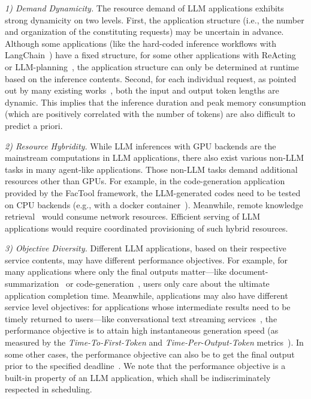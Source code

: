  \emph{1) Demand Dynamicity.}
        The resource demand of LLM applications exhibits strong dynamicity on two levels. %
        First, the application structure (i.e., the number and organization of the constituting requests) may be uncertain in advance.
        Although some applications (like the hard-coded inference workflows with LangChain~\cite{topsakal2023creating}) have a fixed structure, for some other applications with ReActing~\cite{ji2023towards,yao2022react} or LLM-planning~\cite{shen2024hugginggpt}, the application structure can only be determined at runtime based on the inference contents. 
        Second, for each individual request, as pointed out by many existing works~\cite{gao2024cost,wu2023fast}, both the input and output token lengths are dynamic.
        This implies that the inference duration and peak memory consumption (which are positively correlated with the number of tokens) are also difficult to predict a priori.
        
 \emph{2) Resource Hybridity.}
        While LLM inferences with GPU backends are the mainstream computations in LLM applications, there also exist various non-LLM tasks in many agent-like applications. 
	Those non-LLM tasks demand additional resources other than GPUs.
	For example, in the code-generation application provided by the FacTool framework, the LLM-generated codes need to be tested on CPU backends (e.g., with a        docker container~\cite{factool_code}). 
	Meanwhile, remote knowledge retrieval~\cite{lewis2020retrieval} would consume network resources. 
        Efficient serving of LLM applications would require coordinated provisioning of such hybrid resources. %
        
 \emph{3) Objective Diversity.}
        Different LLM applications, based on their respective service contents, may have different performance objectives.
        For example, for many applications where only the final outputs matter---like document-summarization~\cite{jin2024comprehensive} or code-generation~\cite{autogen}, users only care about the ultimate application completion time.
        Meanwhile, applications may also have different service level objectives: for applications whose intermediate results need to be timely returned to users---like conversational text streaming services~\cite{liu2024andes}, the performance objective is to attain high instantaneous generation speed (as measured by the \emph{Time-To-First-Token} and \emph{Time-Per-Output-Token} metrics~\cite{zhong_distserve_2024}).
        In some other cases, the performance objective can also be to get the final output prior to the specified deadline~\cite{nie2024aladdin}. 
        We note that the performance objective is a built-in property of an LLM application, which shall be indiscriminately respected in scheduling.
        
